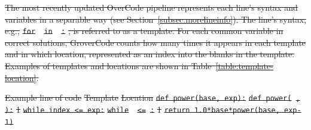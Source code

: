 \documentclass[12pt,twoside]{mitthesis}
\providecommand{\DIFdeltex}[1]{{\protect\color{red}\sout{#1}}}                      %
\providecommand{\DIFdelFL}[1]{\DIFdel{#1}} %
\providecommand{\DIFdel}[1]{\texorpdfstring{\DIFdeltex{#1}}{}} %
\begin{document}
\DIFdel{The most recently updated OverCode pipeline represents each line's syntax and variables in a separable way (see Section~\ref{subsec:morelineinfo}). The line's syntax, e.g., }\texttt{\DIFdel{for }\underline{\DIFdel{\hspace{1em}}} %
\DIFdel{in }\underline{\DIFdel{\hspace{1em}}}%
\DIFdel{:}}%
\DIFdel{, is referred to as a template. For each common variable in correct solutions, GroverCode counts how many times it appears in each template and in which location, represented as an index into the blanks in the template. Examples of templates and locations are shown in Table~\ref{table:template-location}. 
}%

\DIFdelFL{Example line of code }%
\DIFdelFL{Template }%
\DIFdelFL{Location }%
\texttt{\DIFdelFL{def power(base, exp):}} %
\texttt{\DIFdelFL{def power(}\underline{\DIFdelFL{\hspace{1em}}}%
\DIFdelFL{,}\underline{\DIFdelFL{\hspace{1em}}}%
\DIFdelFL{):}} %
\DIFdelFL{1 }%
\texttt{\DIFdelFL{while index <= exp:}} %
\texttt{\DIFdelFL{while }\underline{\DIFdelFL{\hspace{1em}}}%
\DIFdelFL{<=}\underline{\DIFdelFL{\hspace{1em}}}%
\DIFdelFL{:}} %
\DIFdelFL{1 }%
\texttt{\DIFdelFL{return 1.0*base*power(base, exp-1)}} %
\end{document}

